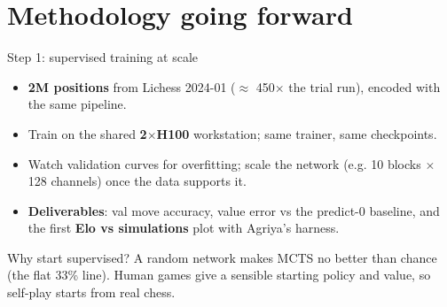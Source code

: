 \documentclass[aspectratio=169, 10pt]{beamer}
\begin{document}
\section{Methodology going forward}

\begin{frame}{Step 1: supervised training at scale}
  \begin{itemize}
    \item \textbf{2M positions} from Lichess 2024-01 ($\approx$ 450$\times$ the trial run),
      encoded with the same pipeline.
    \item Train on the shared \textbf{2$\times$H100} workstation; same trainer, same
      checkpoints.
    \item Watch validation curves for overfitting; scale the network (e.g. 10 blocks
      $\times$ 128 channels) once the data supports it.
    \item \textbf{Deliverables}: val move accuracy, value error vs the predict-0 baseline, and
      the first \textbf{Elo vs simulations} plot with Agriya's harness.
  \end{itemize}
  \medskip
  \begin{block}{Why start supervised?}
    A random network makes MCTS no better than chance (the flat 33\% line). Human games give a
    sensible starting policy and value, so self-play starts from real chess.
  \end{block}
\end{frame}
\end{document}
